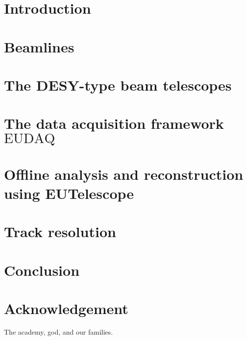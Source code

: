 \documentclass[a4paper,10pt]{scrartcl}
\newcommand{\eudaq}{\ensuremath{\textrm{EUDAQ}}}
\begin{document}
\tableofcontents


\section{Introduction}
\label{sec:intro}


\section{Beamlines}
\label{sec:beamlines}


\section{The DESY-type beam telescopes}
\label{sec:tscope}


\section{The data acquisition framework \eudaq}
\label{sec:eudaq}


\section{Offline analysis and reconstruction using EUTelescope}
\label{sec:offline}


\section{Track resolution}
\label{sec:trackres}


\section{Conclusion}
\label{sec:conclusion}



\section*{Acknowledgement}
The academy, god, and our families.

\small


\end{document}
